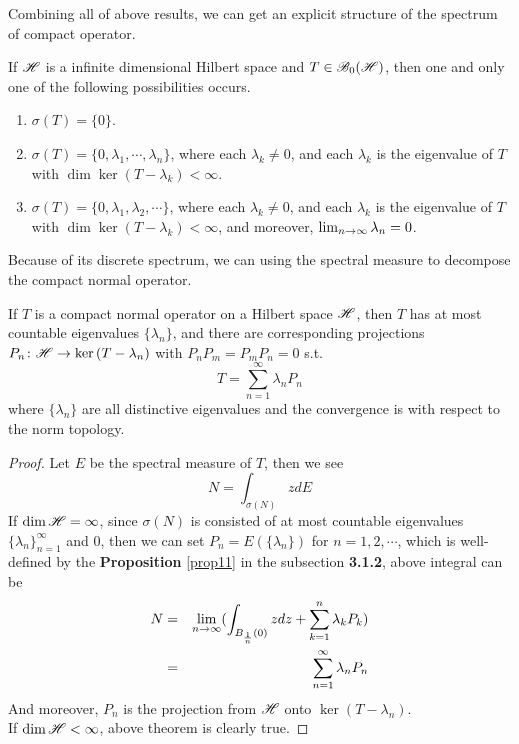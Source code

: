 Combining all of above results, we can get an explicit structure of the spectrum of compact operator.

\begin{thm}[Riesz]
	If $\mathscr{H}$ is a infinite dimensional Hilbert space and $T \in \mathscr{B}_{0}\mathscr{(H)}$, then one and only one of the following possibilities occurs.
	\begin{enumerate}[label=\arabic*)]
		\item $\sigma(T) = \{0\}$.
		\item $\sigma(T) = \{0,\lambda_1,\cdots,\lambda_n\}$, where each $\lambda_k \neq 0$, and each $\lambda_k$ is the eigenvalue of $T$ with $\dim{\ker{(T-\lambda_k)}}<\infty$.
		\item $\sigma(T) = \{0,\lambda_1,\lambda_2,\cdots\}$, where each $\lambda_k \neq 0$, and each $\lambda_k$ is the eigenvalue of $T$ with $\dim{\ker{(T-\lambda_k)}}<\infty$, and moreover, $\lim_{n \rightarrow \infty} \lambda_n =0$.
	\end{enumerate}
\end{thm}

Because of its discrete spectrum, we can using the spectral measure to decompose the compact normal operator.

\begin{thm}
	If $T$ is a compact normal operator on a Hilbert space $\mathscr{H}$, then $T$ has at most countable eigenvalues $\{\lambda_n\}$, and there are corresponding projections $P_n \colon \mathscr{H} \rightarrow \ker{(T-\lambda_n)}$ with $P_nP_m=P_mP_n=0$ s.t.
	\begin{equation*}
		T = \sum_{n=1}^{\infty} \lambda_n P_n
	\end{equation*}
	where $\{\lambda_n\}$ are all distinctive eigenvalues and the convergence is with respect to the norm topology.
\end{thm}
\begin{proof}
	Let $E$ be the spectral measure of $T$, then we see
	\begin{equation*}
		N = \int_{\sigma(N)} z dE
	\end{equation*}
	If $\dim{\mathscr{H}} = \infty$, since $\sigma(N)$ is consisted of at most countable eigenvalues $\{\lambda_n\}_{n=1}^{\infty}$ and $0$, then we can set $P_n = E(\{\lambda_n\})$ for $n = 1,2,\cdots$, which is well-defined by the \textbf{Proposition} \ref{prop11} in the subsection \textbf{3.1.2}, above integral can be
	\begin{eqnarray*}
		N &=& \lim_{n \rightarrow \infty} (\int_{B_{\frac{1}{n}}(0)} z dz + \sum_{k=1}^{n} \lambda_k P_k) \\
		&=& \sum_{n=1}^{\infty} \lambda_n P_n
	\end{eqnarray*} 
	And moreover, $P_n$ is the projection from $\mathscr{H}$ onto $\ker{(T-\lambda_n)}$. \\
	If $\dim{\mathscr{H}} < \infty$, above theorem is clearly true.
\end{proof}

